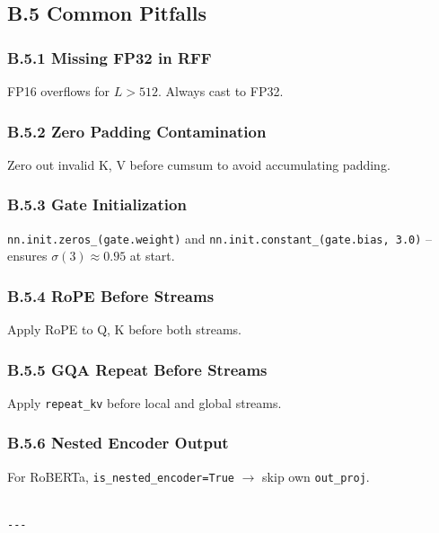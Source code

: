 \subsection{B.5 Common Pitfalls}

\subsubsection{B.5.1 Missing FP32 in RFF}

FP16 overflows for $L > 512$. Always cast to FP32.

\subsubsection{B.5.2 Zero Padding Contamination}

Zero out invalid K, V before cumsum to avoid accumulating padding.

\subsubsection{B.5.3 Gate Initialization}

\texttt{nn.init.zeros\_(gate.weight)} and \texttt{nn.init.constant\_(gate.bias, 3.0)} -- 
ensures $\sigma(3) \approx 0.95$ at start.

\subsubsection{B.5.4 RoPE Before Streams}

Apply RoPE to Q, K before both streams.

\subsubsection{B.5.5 GQA Repeat Before Streams}

Apply \texttt{repeat\_kv} before local and global streams.

\subsubsection{B.5.6 Nested Encoder Output}

For RoBERTa, \texttt{is\_nested\_encoder=True} $\to$ skip own \texttt{out\_proj}.
\begin{lstlisting}

---
\end{lstlisting}